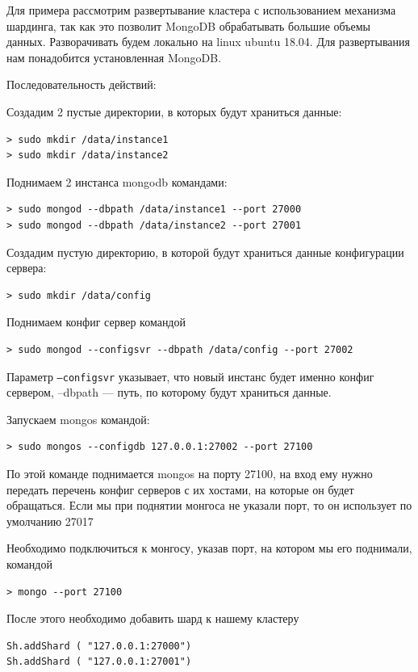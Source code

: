 Для примера рассмотрим развертывание кластера с использованием механизма шардинга, так как это позволит MongoDB обрабатывать большие объемы данных.
Разворачивать будем локально на linux ubuntu 18.04. Для развертывания нам понадобится установленная ​​MongoDB.

Последовательность действий:

Создадим 2 пустые директории, в которых будут храниться данные:
\begin{lstlisting}
> sudo mkdir /data/instance1
> sudo mkdir /data/instance2
\end{lstlisting}

Поднимаем 2 инстанса mongodb командами:
\begin{lstlisting}
> sudo mongod --dbpath /data/instance1 --port 27000
> sudo mongod --dbpath /data/instance2 --port 27001
\end{lstlisting}

Создадим пустую директорию, в которой будут храниться данные конфигурации сервера:
\begin{lstlisting}
> sudo mkdir /data/config
\end{lstlisting}

Поднимаем конфиг сервер командой
\begin{lstlisting}
> sudo mongod --configsvr --dbpath /data/config --port 27002
\end{lstlisting}

Параметр \texttt{--configsvr} указывает, что новый инстанс будет именно конфиг сервером, --dbpath --- путь, по которому будут храниться данные.

Запускаем mongos командой:
\begin{lstlisting}
> sudo mongos --configdb 127.0.0.1:27002 --port 27100
\end{lstlisting}

По этой команде поднимается mongos на порту 27100, на вход ему нужно передать перечень конфиг серверов с их хостами, на которые он будет обращаться. Если мы при поднятии монгоса не указали порт, то он использует по умолчанию 27017

Необходимо подключиться к монгосу, указав порт, на котором мы его поднимали, командой
\begin{lstlisting}
> mongo --port 27100
\end{lstlisting}

После этого необходимо добавить шард к нашему кластеру
\begin{lstlisting}
Sh.addShard ( "127.0.0.1:27000")
Sh.addShard ( "127.0.0.1:27001")
\end{lstlisting}

